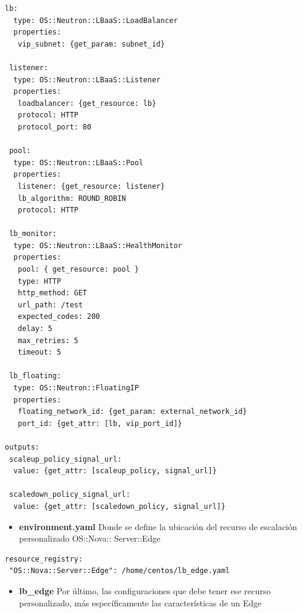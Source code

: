 \documentclass[12pt,a4paper,oneside]{book}
\begin{document}
\begin{lstlisting}[style=codigobase, caption= template.yaml]
 lb:
  type: OS::Neutron::LBaaS::LoadBalancer
  properties:
   vip_subnet: {get_param: subnet_id}
  
 listener:
  type: OS::Neutron::LBaaS::Listener
  properties:
   loadbalancer: {get_resource: lb}
   protocol: HTTP
   protocol_port: 80
  
 pool:
  type: OS::Neutron::LBaaS::Pool
  properties:
   listener: {get_resource: listener}
   lb_algorithm: ROUND_ROBIN
   protocol: HTTP
  
 lb_monitor: 
  type: OS::Neutron::LBaaS::HealthMonitor
  properties:
   pool: { get_resource: pool }
   type: HTTP
   http_method: GET
   url_path: /test
   expected_codes: 200 
   delay: 5
   max_retries: 5
   timeout: 5
       
 lb_floating:
  type: OS::Neutron::FloatingIP
  properties:
   floating_network_id: {get_param: external_network_id}
   port_id: {get_attr: [lb, vip_port_id]}
  
outputs:
 scaleup_policy_signal_url:
  value: {get_attr: [scaleup_policy, signal_url]}

 scaledown_policy_signal_url:
  value: {get_attr: [scaledown_policy, signal_url]}

\end{lstlisting}

\vspace{0,5cm}

\begin{itemize}
    \item \textbf{environment.yaml} Donde se define la ubicación del recurso de escalación personalizado OS::Nova:: Server::Edge
\end{itemize}   

\vspace{0,5cm}
\begin{lstlisting}[style=codigobase, caption= environment.yaml]
resource_registry:
 "OS::Nova::Server::Edge": /home/centos/lb_edge.yaml
\end{lstlisting}

\vspace{0,5cm}

\begin{itemize}
    \item \textbf{lb\_edge} Por último, las configuraciones que debe tener ese recurso personalizado, más específicamente las características de un Edge
\end{itemize}   
\end{document}
